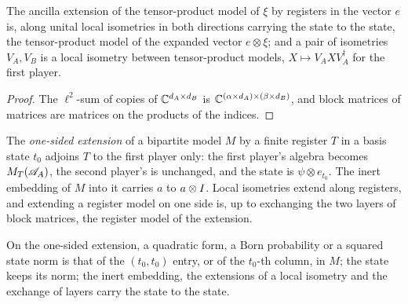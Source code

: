 \begin{lemma}
\label{lem:tensor-expand}
\leanok
The ancilla extension of the tensor-product model of $\xi$ by registers in the vector $e$ is, along
unital local isometries in both directions carrying the state to the state, the tensor-product
model of the expanded vector $e \otimes \xi$; and a pair of isometries $V_A, V_B$ is a local
isometry between tensor-product models, $X \mapsto V_A X V_A^\dagger$ for the first player.
\end{lemma}

\begin{proof}
\leanok
The $\ell^2$-sum of copies of $\mathbb{C}^{d_A \times d_B}$ is $\mathbb{C}^{(\alpha \times d_A) \times (\beta
\times d_B)}$, and block matrices of matrices are matrices on the products of the indices.
\end{proof}

\begin{definition}
\label{def:one-sided-extension}
\leanok
The \emph{one-sided extension} of a bipartite model $M$ by a finite register $T$ in a basis state
$t_0$ adjoins $T$ to the first player only: the first player's algebra becomes $M_T(\mathscr{A}_A)$, the
second player's is unchanged, and the state is $\psi \otimes e_{t_0}$. The inert embedding of $M$
into it carries $a$ to $a \otimes I$. Local isometries extend along registers, and extending a
register model on one side is, up to exchanging the two layers of block matrices, the register
model of the extension.
\end{definition}

\begin{lemma}
\label{lem:one-sided-extension}
\leanok
On the one-sided extension, a quadratic form, a Born probability or a squared state norm is that of
the $(t_0, t_0)$ entry, or of the $t_0$-th column, in $M$; the state keeps its norm; the inert
embedding, the extensions of a local isometry and the exchange of layers carry the state to the
state.
\end{lemma}


